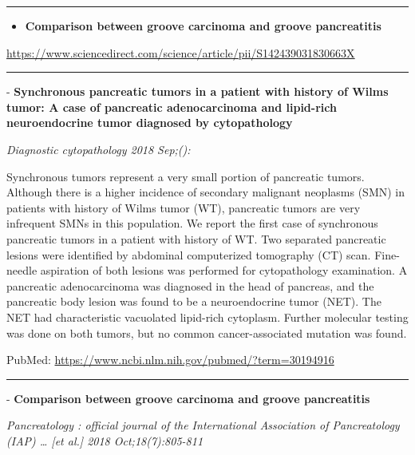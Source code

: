 \documentclass[]{article}
\providecommand{\tightlist}{%
  \setlength{\itemsep}{0pt}\setlength{\parskip}{0pt}}
\begin{document}
\begin{center}\rule{0.5\linewidth}{\linethickness}\end{center}

\begin{itemize}
\tightlist
\item
  \textbf{Comparison between groove carcinoma and groove pancreatitis}
\end{itemize}

\url{https://www.sciencedirect.com/science/article/pii/S142439031830663X}

\begin{center}\rule{0.5\linewidth}{\linethickness}\end{center}

 - \textbf{Synchronous pancreatic tumors in a patient with history of
Wilms tumor: A case of pancreatic adenocarcinoma and lipid-rich
neuroendocrine tumor diagnosed by cytopathology}

\emph{Diagnostic cytopathology 2018 Sep;():}

Synchronous tumors represent a very small portion of pancreatic tumors.
Although there is a higher incidence of secondary malignant neoplasms
(SMN) in patients with history of Wilms tumor (WT), pancreatic tumors
are very infrequent SMNs in this population. We report the first case of
synchronous pancreatic tumors in a patient with history of WT. Two
separated pancreatic lesions were identified by abdominal computerized
tomography (CT) scan. Fine-needle aspiration of both lesions was
performed for cytopathology examination. A pancreatic adenocarcinoma was
diagnosed in the head of pancreas, and the pancreatic body lesion was
found to be a neuroendocrine tumor (NET). The NET had characteristic
vacuolated lipid-rich cytoplasm. Further molecular testing was done on
both tumors, but no common cancer-associated mutation was found.

PubMed: \url{https://www.ncbi.nlm.nih.gov/pubmed/?term=30194916}

{}

{}

\begin{center}\rule{0.5\linewidth}{\linethickness}\end{center}

 - \textbf{Comparison between groove carcinoma and groove pancreatitis}

\emph{Pancreatology : official journal of the International Association
of Pancreatology (IAP) \ldots{} {[}et al.{]} 2018 Oct;18(7):805-811}
\end{document}
